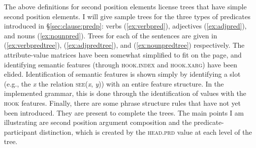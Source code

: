 The above definitions for second position elements license trees that have simple second position elements. I will give sample trees for the three types of predicates introduced in \S\ref{sec:clause:predp}: verbs (\ref{ex:verbpred}), adjectives (\ref{ex:adjpred}), and nouns (\ref{ex:nounpred}). Trees for each of the sentences are given in (\ref{ex:verbpredtree}), (\ref{ex:adjpredtree}), and (\ref{ex:nounpredtree}) respectively. The attribute-value matrices have been somewhat simplified to fit on the page, and identifying semantic features (through \textsc{hook.index} and \textsc{hook.xarg}) have been elided. Identification of semantic features is shown simply by identifying a slot (e.g., the \textit{x} the relation \textsc{see}(\textit{x}, \textit{y})) with an entire feature structure. In the implemented grammar, this is done through the identification of values with the \textsc{hook} features. Finally, there are some phrase structure rules that have not yet been introduced. They are present to complete the trees. The main points I am illustrating are second position argument composition and the predicate-participant distinction, which is created by the \textsc{head.prd} value at each level of the tree. %

